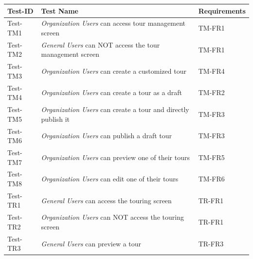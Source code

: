 \documentclass[12pt, titlepage]{article}
\begin{document}
\begin{table}[htpb!]
  \centering
  \begin{tabular}{|l|p{8cm}|p{3cm}|}
    \hline
    \textbf{Test-ID} & \textbf{Test Name}                                                                                                    & \textbf{Requirements} \\
    \hline
    Test-TM1         & \textit{Organization Users} can access tour management screen                                                         & TM-FR1                \\
    \hline
    Test-TM2         & \textit{General Users} can NOT access the tour management screen                                                      & TM-FR1                \\
    \hline
    Test-TM3         & \textit{Organization Users} can create a customized tour                                                              & TM-FR4                \\
    \hline
    Test-TM4         & \textit{Organization Users} can create a tour as a draft                                                              & TM-FR2                \\
    \hline
    Test-TM5         & \textit{Organization Users} can create a tour and directly publish it                                                 & TM-FR3                \\
    \hline
    Test-TM6         & \textit{Organization Users} can publish a draft tour                                                                  & TM-FR3                \\
    \hline
    Test-TM7         & \textit{Organization Users} can preview one of their tours                                                            & TM-FR5                \\
    \hline
    Test-TM8         & \textit{Organization Users} can edit one of their tours                                                               & TM-FR6                \\
    \hline
    Test-TR1         & \textit{General Users} can access the touring screen                                                                  & TR-FR1                \\
    \hline
    Test-TR2         & \textit{Organization Users} can NOT access the touring screen                                                         & TR-FR1                \\
    \hline
    Test-TR3         & \textit{General Users} can preview a tour                                                                             & TR-FR3                \\

\end{tabular}
\end{table}
\end{document}
